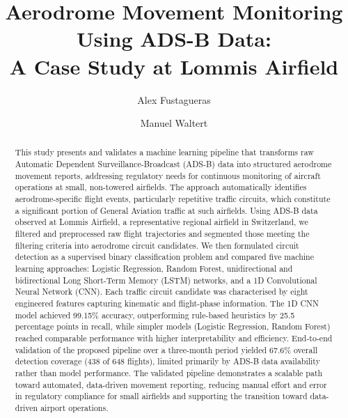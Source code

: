 \documentclass[
  manuscript=proceedings,  %
  layout=preprint,         %
  year=2025,
  volume=x,
]{extra/joas}
\title{Aerodrome Movement Monitoring Using ADS-B Data: \\ A Case Study at Lommis Airfield}
\author{Alex Fustagueras \orcid{0009-0005-7063-6295}}
\affiliation{Centre for Aviation, Zurich University of Applied Sciences, Winterthur, Switzerland}
\author{Manuel Waltert \orcid{0000-0001-7649-6581}}
\affiliation{Centre for Aviation, Zurich University of Applied Sciences, Winterthur, Switzerland}
\begin{document}

\begin{abstract}
This study presents and validates a machine learning pipeline that transforms raw Automatic Dependent Surveillance-Broadcast (ADS-B) data into structured aerodrome movement reports, addressing regulatory needs for continuous monitoring of aircraft operations at small, non-towered airfields. The approach automatically identifies aerodrome-specific flight events, particularly repetitive traffic circuits, which constitute a significant portion of General Aviation traffic at such airfields. Using ADS-B data observed at Lommis Airfield, a representative regional airfield in Switzerland, we filtered and preprocessed raw flight trajectories and segmented those meeting the filtering criteria into aerodrome circuit candidates. We then formulated circuit detection as a supervised binary classification problem and compared five machine learning approaches: Logistic Regression, Random Forest, unidirectional and bidirectional Long Short-Term Memory (LSTM) networks, and a 1D Convolutional Neural Network (CNN). Each traffic circuit candidate was characterised by eight engineered features capturing kinematic and flight-phase information. The 1D CNN model achieved 99.15\% accuracy, outperforming rule-based heuristics by 25.5 percentage points in recall, while simpler models (Logistic Regression, Random Forest) reached comparable performance with higher interpretability and efficiency. End-to-end validation of the proposed pipeline over a three-month period yielded 67.6\% overall detection coverage (438 of 648 flights), limited primarily by ADS-B data availability rather than model performance. The validated pipeline demonstrates a scalable path toward automated, data-driven  movement reporting, reducing manual effort and error in regulatory compliance for small airfields and supporting the transition toward data-driven airport operations.
\end{abstract}
\end{document}
